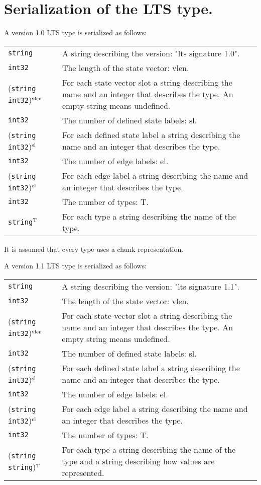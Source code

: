 \documentclass{article}
\theoremstyle{plain}
\begin{document}
\section{Serialization of the LTS type.}

A version 1.0 LTS type is serialized as follows:

\par\noindent\begin{tabularx}{\textwidth}{lX}
{\tt string} & A string describing the version: "lts signature 1.0".
\\
{\tt int32} & The length of the state vector: vlen.
\\
({\tt string} {\tt int32})${}^{\rm vlen}$ & For each state vector slot a string describing the name and an integer that describes the type.
An empty string means undefined.
\\
{\tt int32} & The number of defined state labels: sl.
\\
({\tt string} {\tt int32})${}^{\rm sl}$ & For each defined state label a string describing the name and an integer that describes the type.
\\
{\tt int32} & The number of edge labels: el.
\\
({\tt string} {\tt int32})${}^{\rm el}$ & For each edge label a string describing the name and an integer that describes the type.
\\
{\tt int32} & The number of types: T.
\\
{\tt string}${}^{\rm T}$ & For each type a string describing the name of the type.
\end{tabularx}

It is assumed that every type uses a chunk representation.

\bigskip

A version 1.1 LTS type is serialized as follows:

\par\noindent\begin{tabularx}{\textwidth}{lX}
{\tt string} & A string describing the version: "lts signature 1.1".
\\
{\tt int32} & The length of the state vector: vlen.
\\
({\tt string} {\tt int32})${}^{\rm vlen}$ & For each state vector slot a string describing the name and an integer that describes the type.
An empty string means undefined.
\\
{\tt int32} & The number of defined state labels: sl.
\\
({\tt string} {\tt int32})${}^{\rm sl}$ & For each defined state label a string describing the name and an integer that describes the type.
\\
{\tt int32} & The number of edge labels: el.
\\
({\tt string} {\tt int32})${}^{\rm el}$ & For each edge label a string describing the name and an integer that describes the type.
\\
{\tt int32} & The number of types: T.
\\
({\tt string} {\tt string})${}^{\rm T}$ & For each type a string describing the name of the type and a string describing how values are represented.
\end{tabularx}
\end{document}
